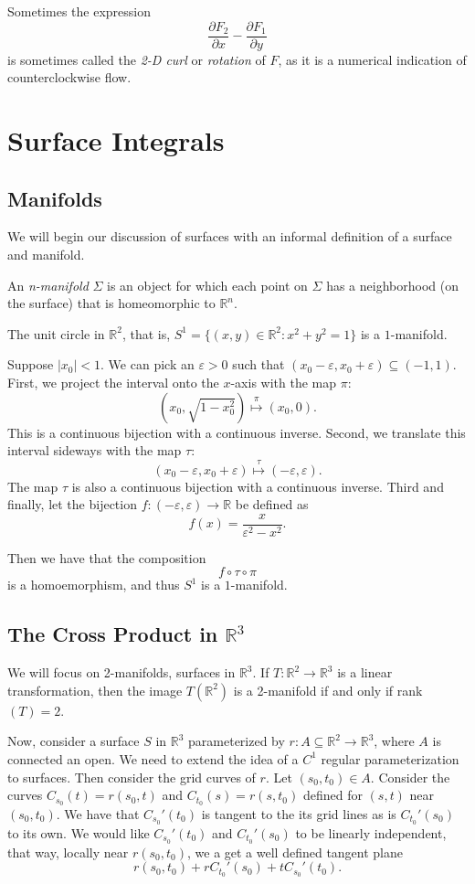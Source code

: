\documentclass[11pt]{article}
\theoremstyle{definition}
\newcommand{\R}{\mathbb{R}}                      %
\newcommand{\dell}{\partial}
\begin{document}
\note Sometimes the expression 
$$
\frac{\dell F_2}{\dell x}-\frac{\dell F_1}{\dell y}
$$
is sometimes called the \textit{2-D curl} or \textit{rotation} of $F$, as it is a numerical indication of counterclockwise flow.

\section{Surface Integrals}
\subsection{Manifolds}
We will begin our discussion of surfaces with an informal definition of a surface and manifold.
\begin{mdframed}[backgroundcolor = blue!10]
\vspace{+0.1cm}
 An \textit{n-manifold} $\Sigma$ is an object for which each point on $\Sigma$ has a neighborhood (on the surface) that is homeomorphic to $\R^n$.
\end{mdframed}
\ex The unit circle in $\R^2$, that is, $S^1=\{(x,y)\in\R^2: x^2+y^2=1\}$ is a $1$-manifold.

Suppose $|x_0|<1$. We can pick an $\varepsilon>0$ such that $(x_0-\varepsilon,x_0+\varepsilon)\subseteq (-1,1)$. First, we project the interval onto the $x$-axis with the map $\pi$:
$$
\left(x_0,\sqrt{1-x_0^2}\right) \overset{\pi}{\mapsto} (x_0,0).
$$
This is a continuous bijection with a continuous inverse. Second, we translate this interval sideways with the map $\tau$: 
$$
(x_0-\varepsilon, x_0+\varepsilon)\overset{\tau}{\mapsto} (-\varepsilon,\varepsilon).
$$
The map $\tau$ is also a continuous bijection with a continuous inverse. Third and finally, let the bijection $f:(-\varepsilon,\varepsilon)\to \R$ be defined as 
$$
f(x)=\frac{x}{\varepsilon^2 -x^2}.
$$

Then we have that the composition 
$$
f\circ \tau \circ \pi
$$
is a homoemorphism, and thus $S^1$ is a $1$-manifold.

\subsection{The Cross Product in $\R^3$}
We will focus on 2-manifolds, surfaces in $\R^3$.
\ex If $T:\R^2\to\R^3$ is a linear transformation, then the image $T(\R^2)$ is a 2-manifold if and only if rank$(T)=2$.

Now, consider a surface $S$ in $\R^3$ parameterized by $r:A\subseteq \R^2\to \R^3$, where $A$ is connected an open. We need to extend the idea of a $C^1$ regular parameterization to surfaces. Then consider the grid curves of $r$. Let $(s_0,t_0)\in A$. Consider the curves $C_{s_0}(t) = r(s_0,t)$ and $C_{t_0}(s)=r(s,t_0)$ defined for $(s,t)$ near $(s_0,t_0)$. We have that $C_{s_0}'(t_0)$ is tangent to the its grid lines as is $C_{t_0}'(s_0)$ to its own. We would like $C_{s_0}'(t_0)$ and $C_{t_0}'(s_0)$ to be linearly independent, that way, locally near $r(s_0,t_0)$, we a get a well defined tangent plane
$$
r(s_0,t_0)+rC_{t_0}'(s_0)+tC_{s_0}'(t_0).
$$
\end{document}
